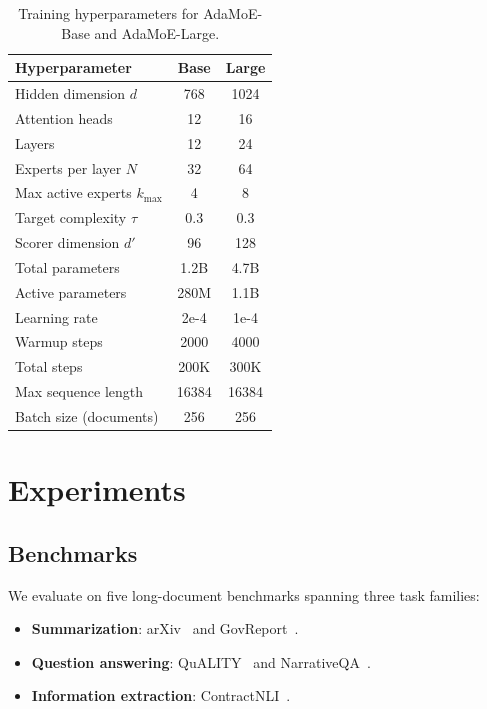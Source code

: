 \documentclass[11pt,a4paper]{article}
\begin{document}
\begin{table}[t]
\centering
\caption{Training hyperparameters for AdaMoE-Base and AdaMoE-Large.}
\label{tab:hyperparams}
\begin{tabular}{lcc}
\toprule
\textbf{Hyperparameter} & \textbf{Base} & \textbf{Large} \\
\midrule
Hidden dimension $d$      & 768   & 1024  \\
Attention heads           & 12    & 16    \\
Layers                    & 12    & 24    \\
Experts per layer $N$     & 32    & 64    \\
Max active experts $k_{\max}$ & 4 & 8     \\
Target complexity $\tau$  & 0.3   & 0.3   \\
Scorer dimension $d'$     & 96    & 128   \\
Total parameters          & 1.2B  & 4.7B  \\
Active parameters         & 280M  & 1.1B  \\
\midrule
Learning rate             & 2e-4  & 1e-4  \\
Warmup steps              & 2000  & 4000  \\
Total steps               & 200K  & 300K  \\
Max sequence length       & 16384 & 16384 \\
Batch size (documents)    & 256   & 256   \\
\bottomrule
\end{tabular}
\end{table}

\section{Experiments}
\label{sec:experiments}

\subsection{Benchmarks}

We evaluate on five long-document benchmarks spanning three task families:

\begin{itemize}[leftmargin=*]
  \item \textbf{Summarization}: arXiv~\cite{cohan2018discourse} and GovReport~\cite{huang2021govreport}.
  \item \textbf{Question answering}: QuALITY~\cite{pang2022quality} and NarrativeQA~\cite{kocisky2018narrativeqa}.
  \item \textbf{Information extraction}: ContractNLI~\cite{koreeda2021contractnli}.
\end{itemize}
\end{document}
